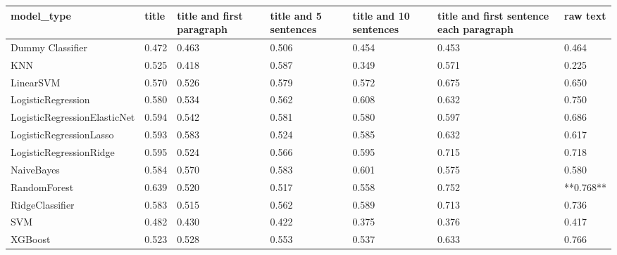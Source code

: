 \begin{tabular}{lllllll}
\toprule
                  model\_type & title & title and first paragraph & title and 5 sentences & title and 10 sentences & title and first sentence each paragraph &  raw text \\
\midrule
            Dummy Classifier & 0.472 &                     0.463 &                 0.506 &                  0.454 &                                   0.453 &     0.464 \\
                         KNN & 0.525 &                     0.418 &                 0.587 &                  0.349 &                                   0.571 &     0.225 \\
                   LinearSVM & 0.570 &                     0.526 &                 0.579 &                  0.572 &                                   0.675 &     0.650 \\
          LogisticRegression & 0.580 &                     0.534 &                 0.562 &                  0.608 &                                   0.632 &     0.750 \\
LogisticRegressionElasticNet & 0.594 &                     0.542 &                 0.581 &                  0.580 &                                   0.597 &     0.686 \\
     LogisticRegressionLasso & 0.593 &                     0.583 &                 0.524 &                  0.585 &                                   0.632 &     0.617 \\
     LogisticRegressionRidge & 0.595 &                     0.524 &                 0.566 &                  0.595 &                                   0.715 &     0.718 \\
                  NaiveBayes & 0.584 &                     0.570 &                 0.583 &                  0.601 &                                   0.575 &     0.580 \\
                RandomForest & 0.639 &                     0.520 &                 0.517 &                  0.558 &                                   0.752 & **0.768** \\
             RidgeClassifier & 0.583 &                     0.515 &                 0.562 &                  0.589 &                                   0.713 &     0.736 \\
                         SVM & 0.482 &                     0.430 &                 0.422 &                  0.375 &                                   0.376 &     0.417 \\
                     XGBoost & 0.523 &                     0.528 &                 0.553 &                  0.537 &                                   0.633 &     0.766 \\
\bottomrule
\end{tabular}
